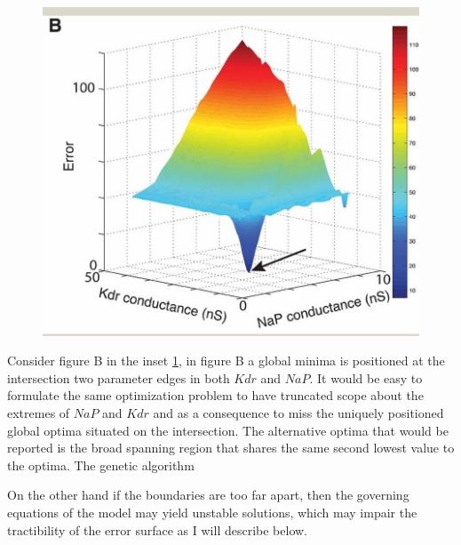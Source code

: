 \begin{figure}
    \centering
    \includegraphics[scale=0.65]{figures/fninf-01-001-g009.jpg}
    \caption{\cite{}}
    \label{fig:best_at_edge}
\end{figure}

Consider figure B in the inset \ref{fig:best_at_edge}, in figure B a global minima is positioned at the intersection two parameter edges in both $Kdr$ and $NaP$. It would be easy to formulate the same optimization problem to have truncated scope about the extremes of $NaP$ and $Kdr$ and as a consequence to miss the uniquely positioned global optima situated on the intersection. The alternative optima that would be reported is the broad spanning region that shares the same second lowest value to the optima. The genetic algorithm

On the other hand if the boundaries are too far apart, then the governing equations of the model may yield unstable solutions, which may impair the tractibility of the error surface as I will describe below.

